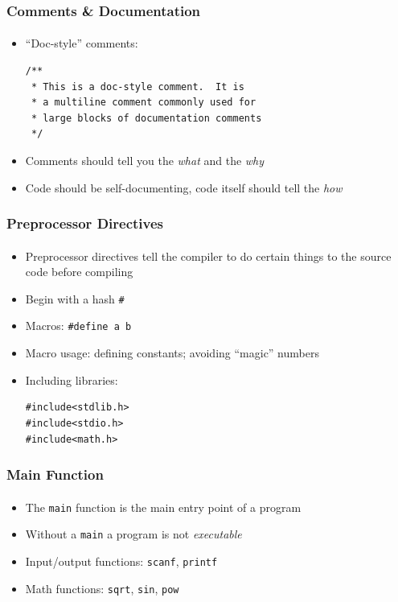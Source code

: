 \documentclass[]{beamer}
\begin{document}
\begin{frame}[fragile]
    \frametitle{Comments \& Documentation}
    \framesubtitle{}

\begin{itemize}[<+->]
  \item ``Doc-style'' comments:
\begin{verbatim}
/**
 * This is a doc-style comment.  It is
 * a multiline comment commonly used for
 * large blocks of documentation comments
 */
\end{verbatim}
  \item Comments should tell you the \emph{what} and the \emph{why}
  \item Code should be self-documenting, code itself should tell the \emph{how}  
\end{itemize}

\end{frame}

\begin{frame}[fragile]
    \frametitle{Preprocessor Directives}
    \framesubtitle{}

\begin{itemize}[<+->]
  \item Preprocessor directives tell the compiler to do 
  certain things to the source code before compiling
  \item Begin with a hash \texttt{#}
  \item Macros: \texttt{#define a b} 
  \item Macro usage: defining constants; avoiding ``magic'' numbers
  \item Including libraries: 
\begin{verbatim}
#include<stdlib.h>
#include<stdio.h> 
#include<math.h> 
\end{verbatim}
\end{itemize}  
    
\end{frame}

\begin{frame}[fragile]
    \frametitle{Main Function}
    \framesubtitle{}

\begin{itemize}[<+->]
  \item The \texttt{main} function is the main entry point 
  of a program
  \item Without a \texttt{main} a program is not \emph{executable}
  \item Input/output functions: \texttt{scanf}, \texttt{printf}
  \item Math functions: \texttt{sqrt}, \texttt{sin}, \texttt{pow}
\end{itemize}

\end{frame}
\end{document}
